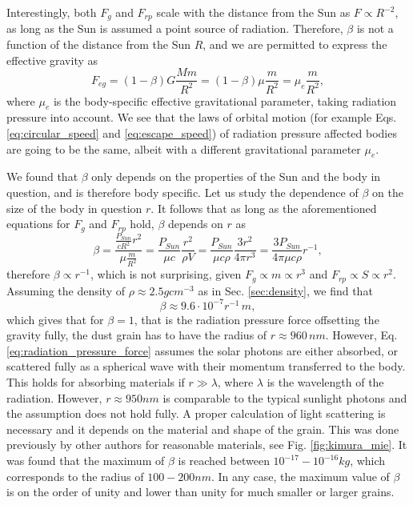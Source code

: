 Interestingly, both $F_g$ and $F_{rp}$ scale with the distance from the Sun as $F \propto {R^{-2}}$, as long as the Sun is assumed a point source of radiation. Therefore, $\beta$ is not a function of the distance from the Sun $R$, and we are permitted to express the effective gravity as 
\begin{equation}
    F_{eg} = (1-\beta) G \frac{M m}{R^2} = (1-\beta) \mu \frac{m}{R^2} = \mu_{e} \frac{m}{R^2},
    \label{eq:effective_gravity}
\end{equation}
where $\mu_{e}$ is the body-specific effective gravitational parameter, taking radiation pressure into account. We see that the laws of orbital motion (for example Eqs. \ref{eq:circular_speed} and \ref{eq:escape_speed}) of radiation pressure affected bodies are going to be the same, albeit with a different gravitational parameter $\mu_e$.

We found that $\beta$ only depends on the properties of the Sun and the body in question, and is therefore body specific. Let us study the dependence of $\beta$ on the size of the body in question $r$. It follows that as long as the aforementioned equations for $F_{g}$ and $F_{rp}$ hold, $\beta$ depends on $r$ as 
\begin{equation} 
    \beta = \frac{\frac{P_{Sun}}{c R^2} r^2}{\mu \frac{m}{R^2}} = \frac{P_{Sun}}{\mu c} \frac{r^2}{\rho V} = \frac{P_{Sun}}{\mu c \rho} \frac{3 r^2}{4 \pi r^3} = \frac{3 P_{Sun}}{4 \pi \mu c \rho} r^{-1},
\end{equation}
therefore $\beta \propto r^{-1}$, which is not surprising, given $F_{g} \propto m \propto r^{3}$ and 
$F_{rp} \propto S \propto r^{2}$. Assuming the density of $\rho \approx 2.5 \si{gcm^{-3}}$ as in Sec. \ref{sec:density}, we find that 
\begin{equation}
    \beta \approx 9.6 \cdot 10^{-7} r^{-1} \, \si{m},
    \label{eq:beta_estimate}
\end{equation}
which gives that for $\beta = 1$, that is the radiation pressure force offsetting the gravity fully, the dust grain has to have the radius of $r \approx 960 \, \si{nm}$. However, Eq. \eqref{eq:radiation_pressure_force} assumes the solar photons are either absorbed, or scattered fully as a spherical wave with their momentum transferred to the body. This holds for absorbing materials if $r \gg \lambda$, where $\lambda$ is the wavelength of the radiation. However, $r \approx 950 \si{nm}$ is comparable to the typical sunlight photons and the assumption does not hold fully. A proper calculation of light scattering is necessary and it depends on the material and shape of the grain. This was done previously by other authors \cite{kimura2003composition} for reasonable materials, see Fig. \ref{fig:kimura_mie}. It was found that the maximum of $\beta$ is reached between $10^{-17} - 10^{-16} \si{kg}$, which corresponds to the radius of $100 - 200 \si{nm}$. In any case, the maximum value of $\beta$ is on the order of unity and lower than unity for much smaller or larger grains.

